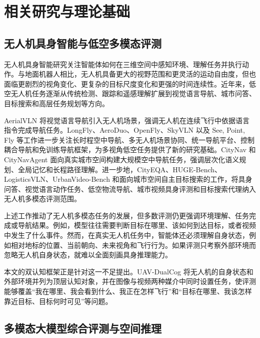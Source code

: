 
\chapter{相关研究与理论基础}

\section{无人机具身智能与低空多模态评测}

无人机具身智能研究关注智能体如何在三维空间中感知环境、理解任务并执行动作。与地面机器人相比，无人机具备更大的视野范围和更灵活的运动自由度，但也面临更剧烈的视角变化、更复杂的目标尺度变化和更强的时间连续性。近年来，低空无人机任务逐渐从传统检测、跟踪和遥感理解扩展到视觉语言导航、城市问答、目标搜索和高层任务规划等方向。

AerialVLN 将视觉语言导航引入无人机场景，强调无人机在连续飞行中依据语言指令完成导航任务\cite{liu2023aerialvln}。LongFly、AeroDuo、OpenFly、SkyVLN 以及 See, Point, Fly 等工作进一步关注长时程空中导航、多无人机场景协同、统一导航平台、控制耦合导航和免训练导航框架，为多视角低空任务提供了新的研究基础\cite{jiang2025longfly,wu2025aeroduo,OpenFly,li2025skyvln,pmlr-v305-hu25e}。CityNav 和 CityNavAgent 面向真实城市空间构建大规模空中导航任务，强调层次化语义规划、全局记忆和长程路径理解\cite{lee2025citynav,zhang2025citynavagent}。进一步地，CityEQA、HUGE-Bench、LogisticsVLN、UrbanVideo-Bench 和面向城市空间自主目标搜索的工作，将具身问答、视觉语言动作任务、低空物流导航、城市视频具身评测和目标搜索代理纳入无人机多模态评测范围\cite{zhao2025cityeqa,guo2026huge,zhang2025logisticsvln,zhao2025urbanvideobench,ji2026towards}。

上述工作推动了无人机多模态任务的发展，但多数评测仍更强调环境理解、任务完成或导航结果。例如，模型往往需要判断目标在哪里、该如何到达目标，或者视频中发生了什么事件。然而，在真实无人机任务中，智能体还必须理解自身状态，例如相对地标的位置、当前朝向、未来视角和飞行行为。如果评测只考察外部环境而忽略无人机自身状态，就难以全面刻画具身推理能力。

本文的双认知框架正是针对这一不足提出。UAV-DualCog 将无人机的自身状态和外部环境并列为顶层认知对象，并在图像与视频两种媒介中同时设置任务，使评测能够覆盖“我在哪里、我会看到什么、我正在怎样飞行”和“目标在哪里、我该怎样靠近目标、目标何时可见”等问题。

\section{多模态大模型综合评测与空间推理}

